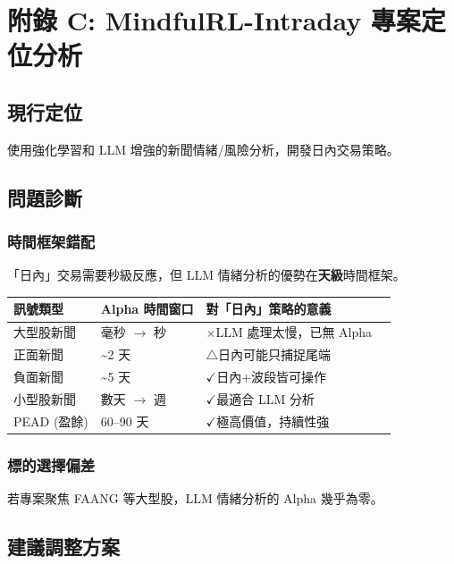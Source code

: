 \documentclass[11pt,a4paper]{article}
\newcommand{\cmark}{\textcolor{successgreen}{$\checkmark$}}
\newcommand{\xmark}{\textcolor{dangered}{$\times$}}
\newcommand{\wmark}{\textcolor{warningyellow}{$\triangle$}}
\begin{document}
\newpage
\section*{附錄 C: MindfulRL-Intraday 專案定位分析}

\subsection*{現行定位}

使用強化學習和 LLM 增強的新聞情緒/風險分析，開發日內交易策略。

\subsection*{問題診斷}

\subsubsection*{時間框架錯配}

「日內」交易需要秒級反應，但 LLM 情緒分析的優勢在\textbf{天級}時間框架。

\begin{table}[H]
\centering
\begin{tabular}{@{}llll@{}}
\toprule
\textbf{訊號類型} & \textbf{Alpha 時間窗口} & \textbf{對「日內」策略的意義} \\
\midrule
大型股新聞 & 毫秒 $\rightarrow$ 秒 & \xmark LLM 處理太慢，已無 Alpha \\
正面新聞 & \textasciitilde 2 天 & \wmark 日內可能只捕捉尾端 \\
負面新聞 & \textasciitilde 5 天 & \cmark 日內+波段皆可操作 \\
小型股新聞 & 數天 $\rightarrow$ 週 & \cmark 最適合 LLM 分析 \\
PEAD (盈餘) & 60--90 天 & \cmark 極高價值，持續性強 \\
\bottomrule
\end{tabular}
\end{table}

\subsubsection*{標的選擇偏差}

若專案聚焦 FAANG 等大型股，LLM 情緒分析的 Alpha 幾乎為零。

\subsection*{建議調整方案}
\end{document}
